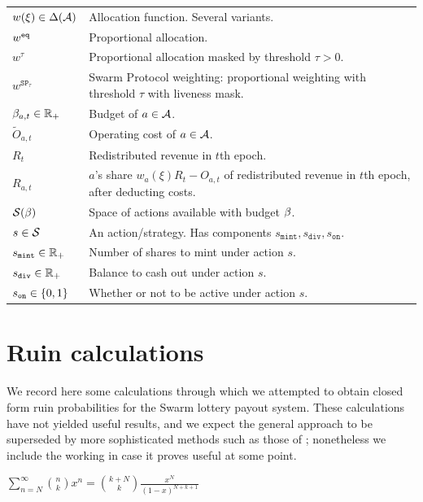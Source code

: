 \begin{tabularx}{\textwidth}{lX}
  $w(\xi)\in\Delta(\mathcal{A})$ & Allocation function. Several variants. \\
  $w^{\mathtt{eq}}$   & Proportional allocation. \\
  $w^\tau$ & Proportional allocation masked by threshold $\tau>0$. \\
  $w^{\mathtt{SP}_\tau}$  & Swarm Protocol weighting: proportional weighting with threshold $\tau$ with liveness mask. \\
  $\beta_{a,t}\in\mathbb{R}_+$ & Budget of $a\in\mathcal{A}$. \\
  $\tilde O_{a,t}$ & Operating cost of $a\in\mathcal{A}$. \\
  $R_t$ & Redistributed revenue in $t$th epoch. \\
  $R_{a,t}$ & $a$'s share $w_a(\xi)R_t-O_{a,t}$ of redistributed revenue in $t$th epoch, after deducting costs. \\
  $\mathcal{S}(\beta)$ & Space of actions available with budget $\beta$. \\
  $s\in\mathcal{S}$ & An action/strategy. Has components $s_\mathtt{mint},s_\mathtt{div},s_\mathtt{on}$. \\
  $s_\mathtt{mint}\in\mathbb{R}_+$ & Number of shares to mint under action $s$. \\
  $s_\mathtt{div}\in\mathbb{R}_+$ & Balance to cash out under action $s$. \\
  $s_{\mathtt{on}}\in\{0,1\}$   & Whether or not to be active under action $s$.

\end{tabularx}




\section{Ruin calculations}
\label{section:ruin-calculations}

We record here some calculations through which we attempted to obtain closed form ruin probabilities for the Swarm lottery payout system.
%
These calculations have not yielded useful results, and we expect the general approach to be superseded by more sophisticated methods such as those of \cite{asmussen2010ruin,albrecher2022blockchain}; nonetheless we include the working in case it proves useful at some point.

\begin{lemma}

  $\sum_{n=N}^\infty { n\choose k } x^n = {k+N \choose k} \frac{x^N}{(1-x)^{N+k+1}}$

\end{lemma}

